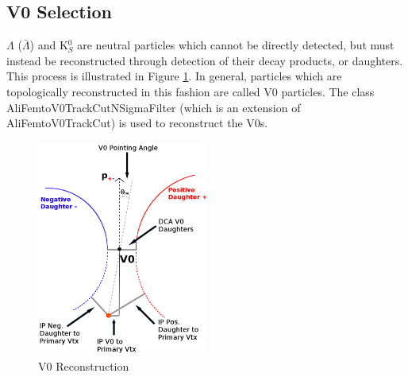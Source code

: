 \documentclass[../AnalysisNoteJBuxton.tex]{subfiles}
\begin{document}
\subsection{V0 Selection}
\label{V0Selection}

$\Lambda$ ($\bar{\Lambda}$) and K$^{0}_{S}$ are neutral particles which cannot be directly detected, but must instead be reconstructed through detection of their decay products, or daughters.  
This process is illustrated in Figure \ref{fig:V0Reconstruction}.
In general, particles which are topologically reconstructed in this fashion are called V0 particles.
The class AliFemtoV0TrackCutNSigmaFilter (which is an extension of AliFemtoV0TrackCut) is used to reconstruct the V0s.

\begin{figure}[h]
  \centering
  \includegraphics[width=0.5\textwidth]{3_DataSelection/Figures/V0CutsGeneral.pdf}
  \caption[V0 Reconstruction]{V0 Reconstruction}
  \label{fig:V0Reconstruction}
\end{figure}



\end{document}
